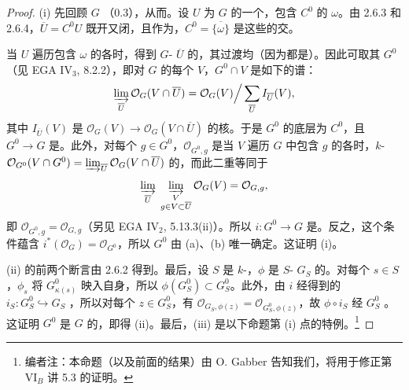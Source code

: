 \begin{proof}
(i) 先回顾 $G$ （0.3），从而。设 $U$ 为 $G$ 的一个，包含 $C^0$ 的 $\omega$。由 2.6.3 和 2.6.4，$\overline U=C^0U$ 既开又闭，且作为，$C^0=\overline{\{\omega\}}$ 是这些的交。

当 $U$ 遍历包含 $\omega$ 的各时，得到 $G$- $\overline U$ 的，其过渡均（因为都是）。因此可取其 $G^0$（见 EGA IV$_3$, 8.2.2），即对 $G$ 的每个 $V$，$G^0\cap V$ 是如下的谱：
\[
\varinjlim_{\overline U}\mathcal O_G(V\cap\overline U)
=\mathcal O_G(V)\Big/\sum_{\overline U}I_{\overline U}(V),
\]
其中 $I_{\overline U}(V)$ 是 $\mathcal O_G(V)\to\mathcal O_G(V\cap\overline U)$ 的核。于是 $G^0$ 的底层为 $C^0$，且 $G^0\to G$ 是。此外，对每个 $g\in G^0$，$\mathcal O_{G^0,g}$ 是当 $V$ 遍历 $G$ 中包含 $g$ 的各时，$k$- $\mathcal O_{G^0}(V\cap G^0)=\varinjlim_{\overline U}\mathcal O_G(V\cap\overline U)$ 的，而此二重等同于
\[
\varinjlim_{\overline U}\;\varinjlim_{\substack{V\\g\in V\subset\overline U}}\mathcal O_G(V)=\mathcal O_{G,g},
\]
即 $\mathcal O_{G^0,g}=\mathcal O_{G,g}$（另见 EGA IV$_2$, 5.13.3(ii)）。所以 $i:G^0\to G$ 是。反之，这个条件蕴含 $i^*(\mathcal O_G)=\mathcal O_{G^0}$，所以 $G^0$ 由 (a)、(b) 唯一确定。这证明 (i)。

(ii) 的前两个断言由 2.6.2 得到。最后，设 $S$ 是 $k$-，$\phi$ 是 $S$- $G_S$ 的。对每个 $s\in S$，$\phi_s$ 将 $G^0_{\kappa(s)}$ 映入自身，所以 $\phi(G^0_S)\subset G^0_S$。此外，由 $i$ 经得到的 $i_S:G^0_S\hookrightarrow G_S$ ，所以对每个 $z\in G^0_S$，有 $\mathcal O_{G_S,\phi(z)}=\mathcal O_{G^0_S,\phi(z)}$，故 $\phi\circ i_S$ 经 $G^0_S$ 。这证明 $G^0$ 是 $G$ 的，即得 (ii)。最后，(iii) 是以下命题第 (i) 点的特例。\footnote{编者注：本命题（以及前面的结果）由 O. Gabber 告知我们，将用于修正第 VI$_B$ 讲 5.3 的证明。}
\end{proof}
